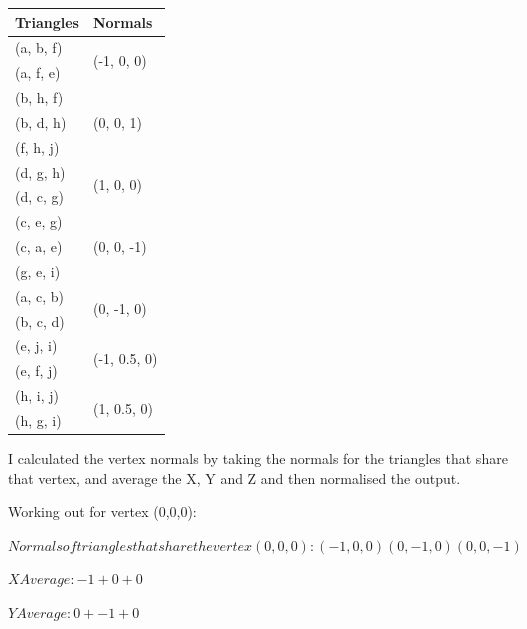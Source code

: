 \documentclass[10pt]{report}
\begin{document}
\begin{table}[H]
    \begin{tabular}{|l|l|} 
    \hline
    \textbf{ Triangles } & \textbf{Normals }              \\ 
    \hline
    (a, b, f)            & \multirow{2}{*}{(-1, 0, 0)}    \\
    (a, f, e)            &                                \\ 
    \hline
    (b, h, f)            & \multirow{3}{*}{(0, 0, 1)}     \\
    (b, d, h)            &                                \\
    (f, h, j)            &                                \\ 
    \hline
    (d, g, h)            & \multirow{2}{*}{(1, 0, 0)}     \\
    (d, c, g)            &                                \\ 
    \hline
    (c, e, g)            & \multirow{3}{*}{(0, 0, -1)}    \\
    (c, a, e)            &                                \\
    (g, e, i)            &                                \\ 
    \hline
    (a, c, b)            & \multirow{2}{*}{(0, -1, 0)}    \\
    (b, c, d)            &                                \\ 
    \hline
    (e, j, i)            & \multirow{2}{*}{(-1, 0.5, 0)}  \\
    (e, f, j)            &                                \\ 
    \hline
    (h, i, j)            & \multirow{2}{*}{(1, 0.5, 0)}   \\
    (h, g, i)            &                                \\
    \hline
    \end{tabular}
\end{table}

I calculated the vertex normals by taking the normals for the triangles that share that vertex, and average the X, Y and Z and then normalised the output.

Working out for vertex (0,0,0):

\(Normals of triangles that share the vertex (0,0,0): (-1,0,0) (0,-1,0) (0,0,-1)\)

\(X Average: -1 + 0 + 0\)

\(Y Average: 0 + -1 + 0\)
\end{document}
